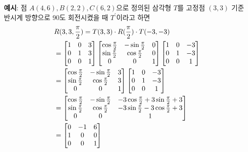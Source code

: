 \begin{framed}
  \noindent \textbf{예시}: 점 $A(4, 6), B(2, 2), C(6, 2)$으로 정의된 삼각형 $T$를 고정점 $(3, 3)$ 기준 반시계 방향으로 90도 회전시켰을 때 $T^\prime$이라고 하면
  $$
  \begin{aligned}
    &R(3, 3, {\pi \over 2}) = T(3, 3) \cdot R({\pi \over 2}) \cdot T(-3, -3) \\
    &=
    \begin{bmatrix}
      1 & 0 & 3 \\
      0 & 1 & 3 \\
      0 & 0 & 1
    \end{bmatrix}
    \begin{bmatrix}
      \cos{\pi \over 2} & -\sin{\pi \over 2} & 0 \\
      \sin{\pi \over 2} & \cos{\pi \over 2} & 0 \\
      0 & 0 & 1
    \end{bmatrix}
    \begin{bmatrix}
      1 & 0 & -3 \\
      0 & 1 & -3 \\
      0 & 0 & 1
    \end{bmatrix} \\
    &=
    \begin{bmatrix}
      \cos{\pi \over 2} & -\sin{\pi \over 2} & 3 \\
      \sin{\pi \over 2} & \cos{\pi \over 2} & 3 \\
      0 & 0 & 1
    \end{bmatrix}
    \begin{bmatrix}
      1 & 0 & -3 \\
      0 & 1 & -3 \\
      0 & 0 & 1
    \end{bmatrix} \\
    &=
    \begin{bmatrix}
      \cos{\pi \over 2} & -\sin{\pi \over 2} & -3 \cos{\pi \over 2} + 3 \sin{\pi \over 2} + 3 \\
      \sin{\pi \over 2} & \cos{\pi \over 2} & -3 \sin{\pi \over 2} - 3 \cos{\pi \over 2} + 3 \\
      0 & 0 & 1
    \end{bmatrix} \\
    &=
    \begin{bmatrix}
      0 & -1 & 6 \\
      1 & 0 & 0 \\
      0 & 0 & 1
    \end{bmatrix} \\

\end{aligned}$$
\end{framed}
